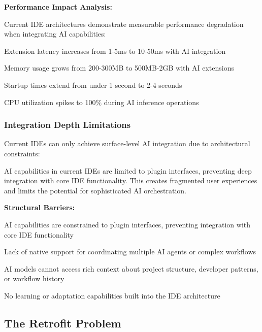 \textbf{Performance Impact Analysis:}

Current IDE architectures demonstrate measurable performance degradation when integrating AI capabilities:

\begin{compactlist}
    \item Extension latency increases from 1-5ms to 10-50ms with AI integration
    \item Memory usage grows from 200-300MB to 500MB-2GB with AI extensions
    \item Startup times extend from under 1 second to 2-4 seconds
    \item CPU utilization spikes to 100\% during AI inference operations
\end{compactlist}

\subsubsection{Integration Depth Limitations}

Current IDEs can only achieve surface-level AI integration due to architectural constraints:

\begin{infobox}[title=Integration Depth Analysis]
AI capabilities in current IDEs are limited to plugin interfaces, preventing deep integration with core IDE functionality. This creates fragmented user experiences and limits the potential for sophisticated AI orchestration.
\end{infobox}

\textbf{Structural Barriers:}

\begin{description}[leftmargin=4cm,labelwidth=3.5cm]
    \item[\textbf{Plugin-Level Only}] AI capabilities are constrained to plugin interfaces, preventing integration with core IDE functionality
    \item[\textbf{No Orchestration}] Lack of native support for coordinating multiple AI agents or complex workflows
    \item[\textbf{Context Isolation}] AI models cannot access rich context about project structure, developer patterns, or workflow history
    \item[\textbf{Static Behavior}] No learning or adaptation capabilities built into the IDE architecture
\end{description}

\subsection{The Retrofit Problem}
\label{subsec:retrofit-problem}

